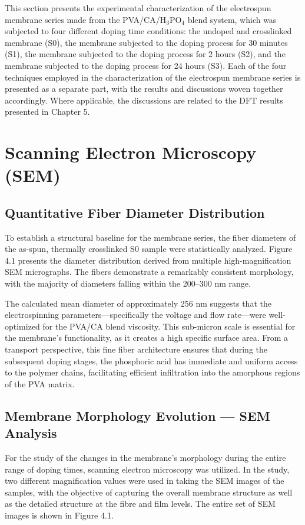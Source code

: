 \documentclass[12pt,a4paper]{report}
\begin{document}
This section presents the experimental characterization of the electrospun membrane series made from the PVA/CA/H\(_3\)PO\(_4\) blend system, which was subjected to four different doping time conditions: the undoped and crosslinked membrane (S0), the membrane subjected to the doping process for 30 minutes (S1), the membrane subjected to the doping process for 2 hours (S2), and the membrane subjected to the doping process for 24 hours (S3). Each of the four techniques employed in the characterization of the electrospun membrane series is presented as a separate part, with the results and discussions woven together accordingly. Where applicable, the discussions are related to the DFT results presented in Chapter 5.

\section{Scanning Electron Microscopy (SEM)}

\subsection{Quantitative Fiber Diameter Distribution}

To establish a structural baseline for the membrane series, the fiber diameters of the as-spun, thermally crosslinked S0 sample were statistically analyzed. Figure 4.1 presents the diameter distribution derived from multiple high-magnification SEM micrographs. The fibers demonstrate a remarkably consistent morphology, with the majority of diameters falling within the 200--300 nm range.

The calculated mean diameter of approximately 256 nm suggests that the electrospinning parameters—specifically the voltage and flow rate—were well-optimized for the PVA/CA blend viscosity. This sub-micron scale is essential for the membrane's functionality, as it creates a high specific surface area. From a transport perspective, this fine fiber architecture ensures that during the subsequent doping stages, the phosphoric acid has immediate and uniform access to the polymer chains, facilitating efficient infiltration into the amorphous regions of the PVA matrix.


\subsection{Membrane Morphology Evolution — SEM Analysis}
For the study of the changes in the membrane’s morphology during the entire range of doping times, scanning electron microscopy was utilized. In the study, two different magnification values were used in taking the SEM images of the samples, with the objective of capturing the overall membrane structure as well as the detailed structure at the fibre and film levels. The entire set of SEM images is shown in Figure 4.1.\cite{39}
\end{document}
